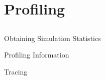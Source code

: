 \section{Profiling}
\subsection{}

\begin{frame}{Obtaining Simulation Statistics}

\end{frame}

\begin{frame}{Profiling Information}

\end{frame}

\begin{frame}{Tracing}

\end{frame}

